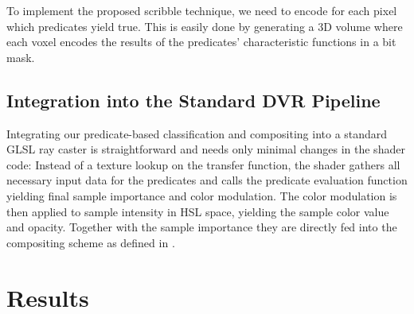 To implement the proposed scribble technique, we need to encode for each pixel which predicates yield true. 
This is easily done by generating a 3D volume where each voxel encodes the results of the predicates' characteristic functions in a bit mask. 



\subsection{Integration into the Standard DVR Pipeline}

Integrating our predicate-based classification and compositing into a standard GLSL ray caster is straightforward and needs only minimal changes in the shader code: Instead of a texture lookup on the transfer function, the shader gathers all necessary input data for the predicates and calls the predicate evaluation function yielding final sample importance and color modulation. 
The color modulation is then applied to sample intensity in HSL space, yielding the sample color value and opacity. 
Together with the sample importance they are directly fed into the compositing scheme as defined in \cite{Pinto10}. 


\section*{Results}
\label{sec:predicates:results}

